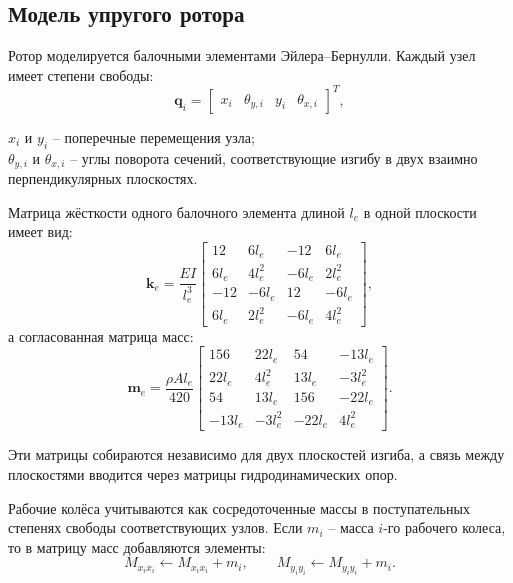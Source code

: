 \subsection{Модель упругого ротора}

Ротор моделируется балочными элементами Эйлера--Бернулли. Каждый узел имеет степени свободы:
\begin{equation}
    \mathbf{q}_i=\begin{bmatrix}x_i&\theta_{y,i}&y_i&\theta_{x,i}\end{bmatrix}^T,
    \label{eq:node_dofs}
\end{equation}
\begin{conditions}
$x_i$ и $y_i$ -- поперечные перемещения узла;\\
$\theta_{y,i}$ и $\theta_{x,i}$ -- углы поворота сечений, соответствующие изгибу в двух взаимно перпендикулярных плоскостях.
\end{conditions}

Матрица жёсткости одного балочного элемента длиной $l_e$ в одной плоскости имеет вид:
\begin{equation}
    \mathbf{k}_e=\frac{EI}{l_e^3}
    \begin{bmatrix}
    12&6l_e&-12&6l_e\\
    6l_e&4l_e^2&-6l_e&2l_e^2\\
    -12&-6l_e&12&-6l_e\\
    6l_e&2l_e^2&-6l_e&4l_e^2
    \end{bmatrix},
    \label{eq:beam_stiffness}
\end{equation}
а согласованная матрица масс:
\begin{equation}
    \mathbf{m}_e=\frac{\rho A l_e}{420}
    \begin{bmatrix}
    156&22l_e&54&-13l_e\\
    22l_e&4l_e^2&13l_e&-3l_e^2\\
    54&13l_e&156&-22l_e\\
    -13l_e&-3l_e^2&-22l_e&4l_e^2
    \end{bmatrix}.
    \label{eq:beam_mass}
\end{equation}

Эти матрицы собираются независимо для двух плоскостей изгиба, а связь между плоскостями вводится через матрицы гидродинамических опор.

Рабочие колёса учитываются как сосредоточенные массы в поступательных степенях свободы соответствующих узлов. Если $m_i$ -- масса $i$-го рабочего колеса, то в матрицу масс добавляются элементы:
\begin{equation}
    M_{x_i x_i}\leftarrow M_{x_i x_i}+m_i,
    \qquad
    M_{y_i y_i}\leftarrow M_{y_i y_i}+m_i.
\end{equation}

